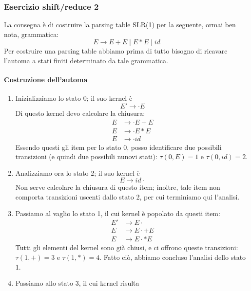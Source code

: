 \documentclass[class=book, crop=false, oneside, 12pt]{standalone}
\begin{document}
\subsubsection{Esercizio shift/reduce 2}
La consegna è di costruire la parsing table SLR(1) per la seguente, ormai ben nota, grammatica:
\begin{equation}
    \label{eq:ex2-sh/re-grammar}
    E \to E+E \mid E*E \mid id
\end{equation} 
Per costruire una parsing table abbiamo prima di tutto bisogno di ricavare l'automa a stati finiti determinato da tale grammatica.
\paragraph{Costruzione dell'automa}
\begin{enumerate}
    \item Inizializziamo lo stato 0; il suo kernel è 
    \begin{equation*}
        E' \to \cdot E
    \end{equation*}
    Di questo kernel devo calcolare la chiusura:
    \begin{align*}
        E &\to \cdot E+E \\
        E &\to \cdot E*E \\
        E &\to \cdot id
    \end{align*}
    Essendo questi gli item per lo stato 0, posso identificare due possibili transizioni (e quindi due possibili nunovi stati): \(\tau(0,E)=1 \textrm{ e } \tau(0,id)=2\).
    \item Analizziamo ora lo stato 2; il suo kernel è 
    \begin{equation*}
        E \to id \cdot    
    \end{equation*}
    Non serve calcolare la chiusura di questo item; inoltre, tale item non comporta transizioni uscenti dallo stato 2, per cui terminiamo qui l'analisi.
    \item Passiamo al vaglio lo stato 1, il cui kernel è popolato da questi item:
    \begin{align*}
        E' &\to E \cdot\\
        E  &\to E \cdot +E \\
        E  &\to E \cdot *E
    \end{align*}
    Tutti gli elementi del kernel sono già chiusi, e ci offrono queste transizioni: \(\tau(1,+)=3 \textrm{ e } \tau(1,*)=4\). Fatto ciò, abbiamo concluso l'analisi dello stato 1.
    \item Passiamo allo stato 3, il cui kernel risulta

\end{enumerate}
\end{document}
